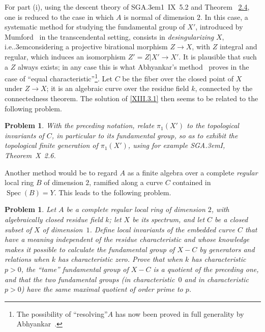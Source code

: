 \documentclass[11pt,a4paper,oneside]{book}
\providecommand{\sisi}[2]{#2}
\providecommand{\pageoriginale}{%
  \refstepcounter{pageoriginal}%
  \marginpar{\raggedright\footnotesize\bfseries\thepageoriginal}%
  \xspace}
\providecommand{\sfootnote}[1]{\footnote{#1}}
\providecommand{\og}{``}
\providecommand{\fg}{''\xspace}
\providecommand{\ie}{i.e.\kern.3em}
\providecommand{\SGA}{\textup{SGA}\kern.3em}
\providecommand{\Spec}{\operatorname{Spec}}
\theoremstyle{plain}
\newtheorem{probleme}[subsection]{Problem}
\theoremstyle{definition}
\theoremstyle{remark}
\renewcommand{\Ref}[1]{\textup{\ref{#1}}}
\begin{document}
For part (i), using the descent theory of \SGA 1~IX~5.2 and
Theorem\pageoriginale~\hyperref[XIII.2.4]{2.4}, one is reduced to the case in which $A$ is normal of
dimension $2$. In this case, a systematic method for studying the
fundamental group of $X'$, introduced by \sisi{MUMFORD}{Mumford}~\cite{XIII.5}
in the transcendental setting, consists in \emph{desingularizing} $X$,
\ie considering a projective birational morphism $Z\to X$, with $Z$
integral and regular, which induces an isomorphism
$Z'=Z|X'\to X'$. It is plausible that such a $Z$ always exists; in
\sisi{all}{any} case this is what \sisi{ABHYANKAR}{Abhyankar}'s method~\cite{XIII.1}
proves in the case of \og equal characteristic\fg\sfootnote{The
possibility of \og resolving\fg $A$ has now been proved in full
generality by Abhyankar~\cite{XIII.8}.}. Let $C$ be the fiber over the
closed point of $X$ under $Z\to X$; it is an algebraic curve over the
residue field $k$, connected by the connectedness theorem. The solution
of \Ref{XIII.3.1} then seems to be related to the following problem.

\begin{probleme} \label{XIII.3.2}
With the preceding notation, relate $\pi_1(X')$ to the topological
invariants of $C$, in particular to its fundamental group, so as to
exhibit the topological finite generation of $\pi_1(X')$, using for
example \SGA \sisi{}{\textup{I}, Theorem~}\textup{X~2.6}.
\end{probleme}

Another method would be to regard $A$ as a finite algebra over a
complete \emph{regular} local ring $B$ of dimension $2$, ramified along
a curve $C$ contained in $\Spec(B)=Y$. This leads to the following
problem.

\begin{probleme} \label{XIII.3.3}
Let $A$ be a complete regular local ring of dimension $2$, with
algebra\sisi{.}{ically} closed residue field $k$; let $X$ be its spectrum,
and let $C$ be a closed subset of $X$ of dimension~$1$. Define local
invariants of the embedded curve $C$ that have a meaning independent of
the residue characteristic and whose knowledge makes it possible to
calculate the fundamental group of $X-C$ by generators and relations
when $k$ has characteristic zero. Prove that when $k$ has characteristic
$p>0$, the \og tame\fg fundamental group of $X-C$ is a quotient of the
preceding one, and that the two fundamental groups (in
\sisi{char.}{characteristic}~$0$ and in
\sisi{char.}{characteristic} $p>0$) have the same maximal quotient of
order prime to $p$.
\end{probleme}
\end{document}
